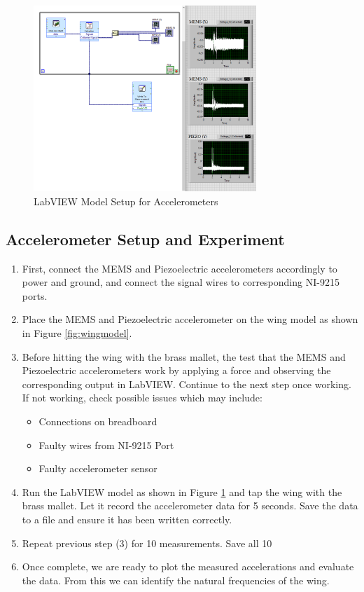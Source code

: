\documentclass{article}
\begin{document}
\begin{figure}[H]
    \centering
    \includegraphics[width = 0.75\textwidth]{lab6images/blockdiagramlab6.PNG}
    \caption{LabVIEW Model Setup for Accelerometers}
    \label{fig:labview}
\end{figure}

\subsection{Accelerometer Setup and Experiment}
\begin{enumerate}
    \item  First, connect the MEMS and Piezoelectric accelerometers accordingly to power and ground, and connect the signal wires to corresponding NI-9215 ports. 
    \item Place the MEMS and Piezoelectric accelerometer on the wing model as shown in Figure \ref{fig:wingmodel}.
    \item Before hitting the wing with the brass mallet, the test that the MEMS and Piezoelectric accelerometers work by applying a force and observing the corresponding output in LabVIEW. Continue to the next step once working. If not working, check possible issues which may include:
    \begin{itemize}
        \item Connections on breadboard
        \item Faulty wires from NI-9215 Port
        \item Faulty accelerometer sensor
    \end{itemize}
    \item Run the LabVIEW model as shown in Figure \ref{fig:labview} and tap the wing with the brass mallet. Let it record the accelerometer data for 5 seconds. Save the data to a file and ensure it has been written correctly.
    \item Repeat previous step (3) for 10 measurements. Save all 10
    \item Once complete, we are ready to plot the measured accelerations and evaluate the data. From this we can identify the natural frequencies of the wing.
\end{enumerate}
\end{document}
